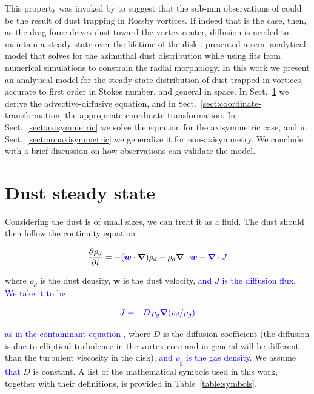 \documentclass[apj]{emulateapj}
\newcommand{\pderiv}[2]{\frac{\partial #1}{\partial #2}}
\renewcommand{\v}[1]{{\boldsymbol{#1}}} %
\def\blue#1{\textcolor{blue}{#1}}
\newcommand{\del}{\v{\nabla}}
\newcommand{\grad}{\del}
\newcommand{\Div}{\del\cdot}
\newcommand{\sect}[1]{Sect.~\ref{#1}}
\newcommand{\beq}{\begin{equation}}
\newcommand{\eeq}{\end{equation}}
\begin{document}
This property was invoked by \citet{Regaly12} to suggest that the 
sub-mm observations of \citet{Brown09} could be the result of dust
trapping in Rossby vortices. If indeed that is the case, then, 
as the drag force drives dust toward the vortex center, diffusion is
needed to maintain a steady state over the lifetime of the disk
\citep{Klahr-Henning97,Chavanis00}. \citet{Birnstiel13} presented a semi-analytical model that solves for the azimuthal dust 
distribution while using fits from numerical simulations
\citep{Pinilla12b} to constrain the radial morphology. In this work we present an analytical 
model for the steady state distribution of dust trapped in vortices, 
accurate to first order in Stokes number, and general in space. In 
\sect{sect:model-equations} we derive the
advective-diffusive equation, and in \sect{sect:coordinate-transformation} the appropriate coordinate
transformation. In \sect{sect:axisymmetric} we solve the equation for the axisymmetric
case, and in \sect{sect:nonaxisymmetric} we generalize it for non-axisymmetry. We conclude
with a brief discussion on how observations can validate the model. 

\section{Dust steady state} 
\label{sect:model-equations}

Considering the dust is of small sizes, we can treat it as a
fluid. The dust should then follow the continuity equation \blue{\citep{Morfill-Volk84,Clarke-Pringle88,Charnoz11}}

\beq
  \pderiv{\rho_d}{t} = -(\v{\blue{w}}\cdot\del)\rho_d - \rho_d \Div{\v{\blue{w}}} - \blue{\Div{J}}
  \label{eq:continuity-w}
\eeq

\noindent where $\rho_d$ is the dust density, $\v{w}$ is the dust
velocity, \blue{and $J$ is the diffusion flux. We take it to be}
 
\beq 
\blue{J=-D\,\rho_g\grad{\left(\rho_d/\rho_g\right)}}\label{eq:j-flux}
\eeq 

\noindent \blue{as in the contaminant equation
\citep{Morfill-Volk84,Clarke-Pringle88,Charnoz11},} where $D$ is the  
diffusion coefficient (the diffusion is due
to elliptical turbulence in the vortex core and in general will be
different than the turbulent viscosity in the disk), \blue{and $\rho_g$ is
the gas density}. We assume \blue{that} $D$ is constant. A list of the mathematical symbols used in this work, together
with their definitions, is provided in Table~\ref{table:symbols}. 
\end{document}
